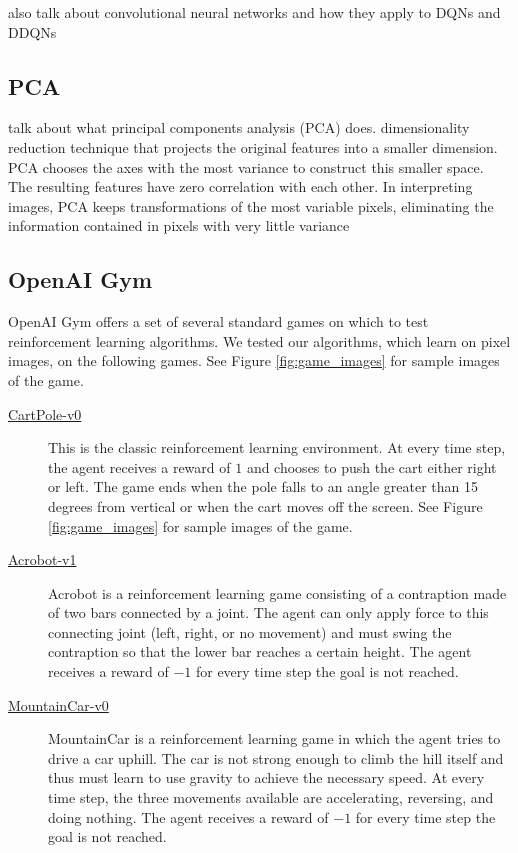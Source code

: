 \documentclass[11pt, twocolumn]{article}
\begin{document}
also talk about convolutional neural networks and how they apply to
DQNs and DDQNs

\subsection{PCA}

talk about what principal components analysis (PCA) does. dimensionality reduction technique that projects the original features into a smaller dimension. PCA chooses the axes with the most variance to construct this smaller space. The resulting features have zero correlation with each other. In interpreting images, PCA keeps transformations of the most variable pixels, eliminating the information contained in pixels with very little variance

\subsection{OpenAI Gym}

OpenAI Gym \cite{brockman2016openai} offers a set of several standard games on which to test reinforcement learning algorithms. We tested our algorithms, which learn on pixel images, on the following games. See Figure \ref{fig:game_images} for sample images of the game.

\begin{description}
\item[\href{https://gym.openai.com/envs/CartPole-v0/}{CartPole-v0}] This is the classic reinforcement learning environment. At every time step, the agent receives a reward of $1$ and chooses to push the cart either right or left. The game ends when the pole falls to an angle greater than 15 degrees from vertical or when the cart moves off the screen. See Figure \ref{fig:game_images} for sample images of the game.
\item[\href{https://gym.openai.com/envs/Acrobot-v1/}{Acrobot-v1}] Acrobot is a reinforcement learning game consisting of a contraption made of two bars connected by a joint. The agent can only apply force to this connecting joint (left, right, or no movement) and must swing the contraption so that the lower bar reaches a certain height. The agent receives a reward of $-1$ for every time step the goal is not reached.
\item[\href{https://gym.openai.com/envs/MountainCar-v0/}{MountainCar-v0}] MountainCar is a reinforcement learning game in which the agent tries to drive a car uphill. The car is not strong enough to climb the hill itself and thus must learn to use gravity to achieve the necessary speed. At every time step, the three movements available are accelerating, reversing, and doing nothing. The agent receives a reward of $-1$ for every time step the goal is not reached. 
\end{description}
\end{document}
